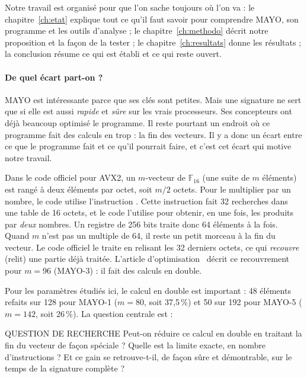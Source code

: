 Notre travail est organisé pour que l'on sache toujours où l'on va : le chapitre~\ref{ch:etat} explique tout ce qu'il faut savoir pour comprendre MAYO, son programme et les outils d'analyse ; le chapitre~\ref{ch:methodo} décrit notre proposition et la façon de la tester ; le chapitre~\ref{ch:resultats} donne les résultats ; la conclusion résume ce qui est établi et ce qui reste ouvert.

\paragraph{De quel écart part-on ?} MAYO est intéressante parce que ses clés sont petites. Mais une signature ne sert que si elle est aussi \emph{rapide} et \emph{sûre} sur les vrais processeurs. Ses concepteurs ont déjà beaucoup optimisé le programme. Il reste pourtant un endroit où ce programme fait des calculs en trop : la fin des vecteurs. Il y a donc un écart entre ce que le programme fait et ce qu'il pourrait faire, et c'est cet écart qui motive notre travail.

Dans le code officiel pour AVX2, un $m$-vecteur de $\mathbb{F}_{16}$ (une suite de $m$ éléments) est rangé à deux éléments par octet, soit $m/2$ octets. Pour le multiplier par un nombre, le code utilise l'instruction \vpshufb{}. Cette instruction fait 32 recherches dans une table de 16 octets, et le code l'utilise pour obtenir, en une fois, les produits par \emph{deux} nombres. Un registre de 256 bits traite donc 64 éléments à la fois. Quand $m$ n'est pas un multiple de 64, il reste un petit morceau à la fin du vecteur. Le code officiel le traite en relisant les 32 derniers octets, ce qui \emph{recouvre} (relit) une partie déjà traitée. L'article d'optimisation~\cite{nibbling} décrit ce recouvrement pour $m=96$ (MAYO-3) : il fait des calculs en double.

Pour les paramètres étudiés ici, le calcul en double est important : 48 éléments refaits sur 128 pour MAYO-1 ($m=80$, soit 37,5\,\%) et 50 sur 192 pour MAYO-5 ($m=142$, soit 26\,\%). La question centrale est :

\begin{bidentidad}{QUESTION DE RECHERCHE}
\centering Peut-on réduire ce calcul en double en traitant la fin du vecteur de façon spéciale ? Quelle est la limite exacte, en nombre d'instructions \vpshufb{} ? Et ce gain se retrouve-t-il, de façon sûre et démontrable, sur le temps de la signature complète ?
\end{bidentidad}

